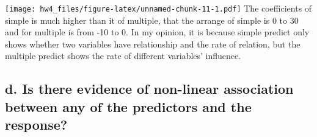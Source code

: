 \documentclass[]{article}
\newenvironment{Shaded}{\begin{snugshade}}{\end{snugshade}}
\newcommand{\DecValTok}[1]{\textcolor[rgb]{0.00,0.00,0.81}{#1}}
\newcommand{\KeywordTok}[1]{\textcolor[rgb]{0.13,0.29,0.53}{\textbf{#1}}}
\newcommand{\NormalTok}[1]{#1}
\newcommand{\OperatorTok}[1]{\textcolor[rgb]{0.81,0.36,0.00}{\textbf{#1}}}
\newcommand{\StringTok}[1]{\textcolor[rgb]{0.31,0.60,0.02}{#1}}
\begin{document}
\begin{Shaded}
\end{Shaded}

\texttt{[image: hw4\_files/figure-latex/unnamed-chunk-11-1.pdf]} The
coefficients of simple is much higher than it of multiple, that the
arrange of simple is 0 to 30 and for multiple is from -10 to 0. In my
opinion, it is because simple predict only shows whether two variables
have relationship and the rate of relation, but the multiple predict
shows the rate of different variables' influence.

\hypertarget{d.-is-there-evidence-of-non-linear-association-between-any-of-the-predictors-and-the-response}{%
\subsection{d. Is there evidence of non-linear association between any
of the predictors and the
response?}\label{d.-is-there-evidence-of-non-linear-association-between-any-of-the-predictors-and-the-response}}
\end{document}
